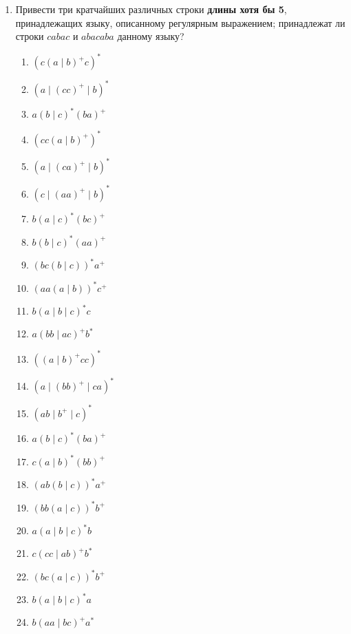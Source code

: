 \documentclass[12pt]{article}
\begin{document}
\begin{enumerate}
\setlength\itemsep{1em}

  \item Привести три кратчайших различных строки \textbf{длины хотя бы 5}, принадлежащих языку, описанному регулярным выражением; принадлежат ли строки $cabac$ и $abacaba$ данному языку?
  \begin{enumerate}[label=\arabic*)]
    \setlength\itemsep{0.8em}
    \item $(c (a \mid b)^+ c)^*$
    \item $(a \mid (cc)^+ \mid b)^*$
    \item $a (b \mid c)^* (ba)^+$
    \item $(c c (a \mid b)^+)^*$
    \item $(a \mid (ca)^+ \mid b)^*$
    \item $(c \mid (aa)^+ \mid b)^*$
    \item $b (a \mid c)^* (bc)^+$
    \item $b (b \mid c)^* (aa)^+$
    \item $(bc (b \mid c))^* a^+$
    \item $(aa (a \mid b))^* c^+$
    \item $b (a \mid b \mid c)^* c$
    \item $a (bb \mid ac)^+ b^*$
    \item $((a \mid b)^+ c c)^*$
    \item $(a \mid (bb)^+ \mid ca)^*$
    \item $(ab \mid b^+ \mid c)^*$
    \item $a (b \mid c)^* (ba)^+$
    \item $c (a \mid b)^* (bb)^+$
    \item $(ab (b \mid c))^* a^+$
    \item $(bb (a \mid c))^* b^+$
    \item $a (a \mid b \mid c)^* b$
    \item $c (cc \mid ab)^+ b^*$
    \item $(bc (a \mid c))^* b^+$
    \item $b (a \mid b \mid c)^* a$
    \item $b (aa \mid bc)^+ a^*$
  \end{enumerate}


\end{enumerate}
\end{document}
